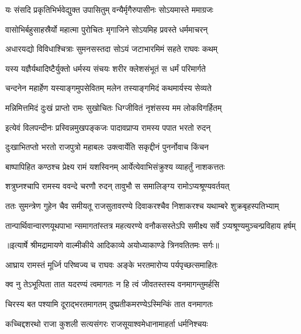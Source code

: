 \twolineshloka
{यः संसदि प्रकृतिभिर्भवेद्युक्त उपासितुम्}
{वन्यैर्मृगैरुपासीनः सोऽयमास्ते ममाग्रजः} %

\twolineshloka
{वासोभिर्बहुसाहस्रैर्यो महात्मा पुरोचितः}
{मृगाजिने सोऽयमिह प्रवस्ते धर्ममाचरन्} %

\twolineshloka
{अधारयद्यो विविधाश्चित्राः सुमनसस्तदा}
{सोऽयं जटाभारमिमं सहते राघवः कथम्} %

\twolineshloka
{यस्य यज्ञैर्यथादिष्टैर्युक्तो धर्मस्य संचयः}
{शरीर क्लेशसंभूतं स धर्मं परिमार्गते} %

\twolineshloka
{चन्दनेन महार्हेण यस्याङ्गमुपसेवितम्}
{मलेन तस्याङ्गमिदं कथमार्यस्य सेव्यते} %

\twolineshloka
{मन्निमित्तमिदं दुःखं प्राप्तो रामः सुखोचितः}
{धिग्जीवितं नृशंसस्य मम लोकविगर्हितम्} %

\twolineshloka
{इत्येवं विलपन्दीनः प्रस्विन्नमुखपङ्कजः}
{पादावप्राप्य रामस्य पपात भरतो रुदन्} %

\twolineshloka
{दुःखाभितप्तो भरतो राजपुत्रो महाबलः}
{उक्त्वार्येति सकृद्दीनं पुनर्नोवाच किंचन} %

\twolineshloka
{बाष्पापिहित कण्ठश्च प्रेक्ष्य रामं यशस्विनम्}
{आर्येत्येवाभिसंक्रुश्य व्याहर्तुं नाशकत्ततः} %

\twolineshloka
{शत्रुघ्नश्चापि रामस्य ववन्दे चरणौ रुदन्}
{तावुभौ स समालिङ्ग्य रामोऽप्यश्रूण्यवर्तयत्} %

\fourlineindentedshloka
{ततः सुमन्त्रेण गुहेन चैव}
{ समीयतू राजसुतावरण्ये}
{दिवाकरश्चैव निशाकरश्च}
{ यथाम्बरे शुक्रबृहस्पतिभ्याम्} %

\fourlineindentedshloka
{तान्पार्थिवान्वारणयूथपाभा}
{न्समागतांस्तत्र महत्यरण्ये}
{वनौकसस्तेऽपि समीक्ष्य सर्वे}
{ऽप्यश्रूण्यमुञ्चन्प्रविहाय हर्षम्} %


{॥इत्यार्षे श्रीमद्रामायणे वाल्मीकीये आदिकाव्ये अयोध्याकाण्डे त्रिनवतितमः सर्गः॥}


\twolineshloka
{आघ्राय रामस्तं मूर्ध्नि परिष्वज्य च राघवः}
{अङ्के भरतमारोप्य पर्यपृच्छत्समाहितः} %

\twolineshloka
{क्व नु तेऽभूत्पिता तात यदरण्यं त्वमागतः}
{न हि त्वं जीवतस्तस्य वनमागन्तुमर्हसि} %

\twolineshloka
{चिरस्य बत पश्यामि दूराद्भरतमागतम्}
{दुष्प्रतीकमरण्येऽस्मिन्किं तात वनमागतः} %

\twolineshloka
{कच्चिद्दशरथो राजा कुशली सत्यसंगरः}
{राजसूयाश्वमेधानामाहर्ता धर्मनिश्चयः} %

